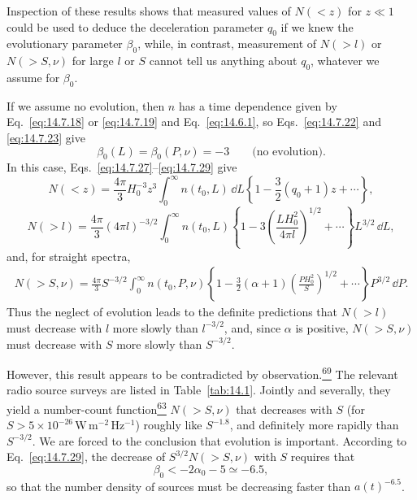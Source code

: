 Inspection of these results shows that measured values of \(N(<z)\) for
\(z\ll1\) could be used to deduce the deceleration parameter \(q_0\) if we
knew the evolutionary parameter \(\beta_0\), while, in contrast,
measurement of \(N(>l)\) or \(N(>S,\nu)\) for large \(l\) or \(S\) cannot
tell us anything about \(q_0\), whatever we assume for \(\beta_0\).

If we assume no evolution, then \(n\) has a time dependence given by
Eq.~\eqref{eq:14.7.18} or \eqref{eq:14.7.19} and
Eq.~\eqref{eq:14.6.1}, so Eqs.~\eqref{eq:14.7.22} and
\eqref{eq:14.7.23} give
\begin{equation}
  \beta_0(L)=\beta_0(P,\nu)=-3
  \qquad\text{(no evolution).}
  \tag{14.7.32}\label{eq:14.7.32}
\end{equation}
In this case, Eqs.~\eqref{eq:14.7.27}--\eqref{eq:14.7.29} give
\begin{equation}
  N(<z)
  =
  \frac{4\pi}{3}H_0^{-3}z^3
  \int_0^\infty n(t_0,L)\,\dd L
  \left\{
    1-\frac32(q_0+1)z+\cdots
  \right\},
  \tag{14.7.33}\label{eq:14.7.33}
\end{equation}
\begin{equation}
  N(>l)
  =
  \frac{4\pi}{3}(4\pi l)^{-3/2}
  \int_0^\infty
  n(t_0,L)
  \left\{
    1
    -3\left(\frac{LH_0^2}{4\pi l}\right)^{1/2}
    +\cdots
  \right\}
  L^{3/2}\,\dd L,
  \tag{14.7.34}\label{eq:14.7.34}
\end{equation}
and, for straight spectra,
\begin{align}
  N(>S,\nu)
  =
  \frac{4\pi}{3}S^{-3/2}
  \int_0^\infty
  n(t_0,P,\nu)
  \left\{
    1
    -\frac32(\alpha+1)
    \left(\frac{PH_0^2}{S}\right)^{1/2}
    +\cdots
  \right\}
  P^{3/2}\,\dd P.
  \tag{14.7.35}\label{eq:14.7.35}
\end{align}
Thus the neglect of evolution leads to the definite predictions that
\(N(>l)\) must decrease with \(l\) more slowly than \(l^{-3/2}\), and,
since \(\alpha\) is positive, \(N(>S,\nu)\) must decrease with \(S\) more
slowly than \(S^{-3/2}\).

However, this result appears to be contradicted by
observation.\hyperref[ch14-ref-69]{\textsuperscript{69}} The relevant radio
source surveys are listed in Table~\ref{tab:14.1}. Jointly and severally,
they yield a number-count
function\hyperref[ch14-ref-63]{\textsuperscript{63}} \(N(>S,\nu)\) that
decreases with \(S\) (for
\(S>5\times10^{-26}\,\mathrm{W\,m^{-2}\,Hz^{-1}}\)) roughly like
\(S^{-1.8}\), and definitely more rapidly than \(S^{-3/2}\). We are forced
to the conclusion that evolution is important. According to
Eq.~\eqref{eq:14.7.29}, the decrease of \(S^{3/2}N(>S,\nu)\) with \(S\)
requires that
\begin{equation}
  \beta_0<-2\alpha_0-5\simeq-6.5,
  \tag{14.7.36}\label{eq:14.7.36}
\end{equation}
so that the number density of sources must be decreasing faster than
\(a(t)^{-6.5}\).

